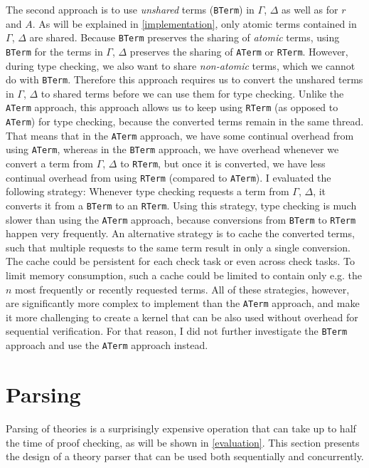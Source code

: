 \documentclass[screen,sigplan,10pt]{acmart}
\begin{document}
The second approach is to use \emph{unshared} terms (\texttt{BTerm}) in
\(\Gamma\), \(\Delta\) as well as for \(r\) and \(A\). As will be
explained in \autoref{implementation}, only atomic terms contained in
\(\Gamma\), \(\Delta\) are shared. Because \texttt{BTerm} preserves the
sharing of \emph{atomic} terms, using \texttt{BTerm} for the terms in
\(\Gamma\), \(\Delta\) preserves the sharing of \texttt{ATerm} or
\texttt{RTerm}. However, during type checking, we also want to share
\emph{non-atomic} terms, which we cannot do with \texttt{BTerm}.
Therefore this approach requires us to convert the unshared terms in
\(\Gamma\), \(\Delta\) to shared terms before we can use them for type
checking. Unlike the \texttt{ATerm} approach, this approach allows us to
keep using \texttt{RTerm} (as opposed to \texttt{ATerm}) for type
checking, because the converted terms remain in the same thread. That
means that in the \texttt{ATerm} approach, we have some continual
overhead from using \texttt{ATerm}, whereas in the \texttt{BTerm}
approach, we have overhead whenever we convert a term from \(\Gamma\),
\(\Delta\) to \texttt{RTerm}, but once it is converted, we have less
continual overhead from using \texttt{RTerm} (compared to
\texttt{ATerm}). I evaluated the following strategy: Whenever type
checking requests a term from \(\Gamma\), \(\Delta\), it converts it
from a \texttt{BTerm} to an \texttt{RTerm}. Using this strategy, type
checking is much slower than using the \texttt{ATerm} approach, because
conversions from \texttt{BTerm} to \texttt{RTerm} happen very
frequently. An alternative strategy is to cache the converted terms,
such that multiple requests to the same term result in only a single
conversion. The cache could be persistent for each check task or even
across check tasks. To limit memory consumption, such a cache could be
limited to contain only e.g. the \(n\) most frequently or recently
requested terms. All of these strategies, however, are significantly
more complex to implement than the \texttt{ATerm} approach, and make it
more challenging to create a kernel that can be also used without
overhead for sequential verification. For that reason, I did not further
investigate the \texttt{BTerm} approach and use the \texttt{ATerm}
approach instead.

\hypertarget{parsing}{%
\section{Parsing}\label{parsing}}

Parsing of theories is a surprisingly expensive operation that can take
up to half the time of proof checking, as will be shown in
\autoref{evaluation}. This section presents the design of a theory
parser that can be used both sequentially and concurrently.
\end{document}
